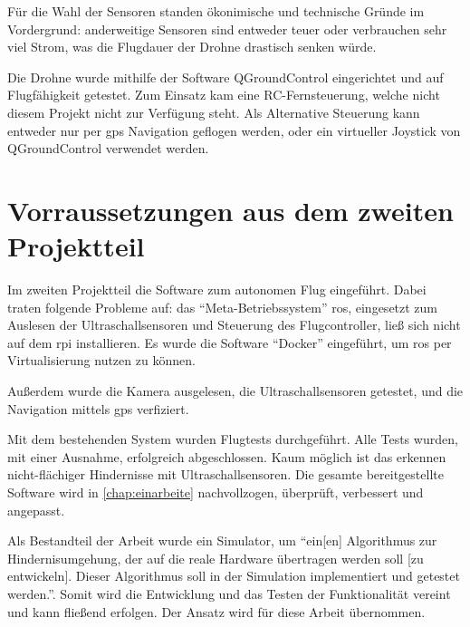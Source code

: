Für die Wahl der Sensoren standen ökonimische und technische Gründe im Vordergrund: anderweitige Sensoren sind entweder teuer oder verbrauchen sehr viel Strom, was die Flugdauer der Drohne drastisch senken würde\cite[Kapitel 4.3.8]{wirthErweiterungBestehendenDrohne2022}.

Die Drohne wurde mithilfe der Software QGroundControl eingerichtet\cite[Kapitel 4.3.5]{wirthErweiterungBestehendenDrohne2022} und auf Flugfähigkeit getestet\cite[Kapitel 4.3.7]{wirthErweiterungBestehendenDrohne2022}. Zum Einsatz kam eine RC-Fernsteuerung, welche nicht diesem Projekt nicht zur Verfügung steht. Als Alternative Steuerung kann entweder nur per \gls{gps} Navigation geflogen werden, oder ein virtueller Joystick von QGroundControl verwendet werden.

\section{Vorraussetzungen aus dem zweiten Projektteil}
Im zweiten Projektteil \cite{wirthErweiterungBestehendenDrohne2022a} die Software zum autonomen Flug eingeführt. Dabei traten folgende Probleme auf: das \enquote{Meta-Betriebssystem} \gls{ros}, eingesetzt zum Auslesen der Ultraschallsensoren und Steuerung des Flugcontroller, ließ sich nicht auf dem \gls{rpi} installieren. Es wurde die Software \enquote{Docker} eingeführt, um \gls{ros} per Virtualisierung nutzen zu können\cite[Kapitel 6.5]{wirthErweiterungBestehendenDrohne2022a}.

Außerdem wurde die Kamera\cite[Kapitel 6.8]{wirthErweiterungBestehendenDrohne2022a} ausgelesen, die Ultraschallsensoren getestet\cite[Kapitel 6.9]{wirthErweiterungBestehendenDrohne2022a}, und die Navigation mittels \gls{gps} verfiziert\cite[Kapitel 6.10]{wirthErweiterungBestehendenDrohne2022a}.

Mit dem bestehenden System wurden Flugtests durchgeführt. Alle Tests wurden, mit einer Ausnahme, erfolgreich abgeschlossen. Kaum möglich ist das erkennen nicht-flächiger Hindernisse mit Ultraschallsensoren\cite[Kapitel 6.10]{wirthErweiterungBestehendenDrohne2022a}. Die gesamte bereitgestellte Software wird in \cref{chap:einarbeite} nachvollzogen, überprüft, verbessert und angepasst.

Als Bestandteil der Arbeit wurde ein Simulator, um \enquote{ein[en] Algorithmus zur Hindernisumgehung, der auf die reale Hardware übertragen werden soll [zu entwickeln]. Dieser Algorithmus soll in der Simulation implementiert und getestet werden.}\cite[Kapitel 8]{wirthErweiterungBestehendenDrohne2022a}. Somit wird die Entwicklung und das Testen der Funktionalität vereint und kann fließend erfolgen. Der Ansatz wird für diese Arbeit übernommen. 


